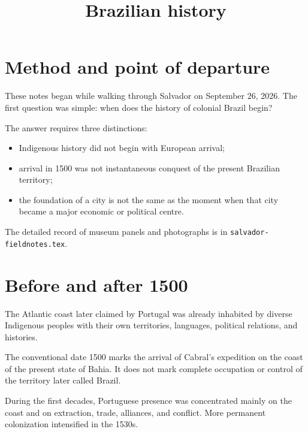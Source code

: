 



\title{Brazilian history}
\maketitle

\label{section-phantom}

\tableofcontents

\section{Method and point of departure}
\label{section-history-method}

These notes began while walking through
Salvador on September 26, 2026.  The first
question was simple: when does the history
of colonial Brazil begin?

The answer requires three distinctions:

\begin{itemize}
\item Indigenous history did not begin with
European arrival;
\item arrival in 1500 was not instantaneous
conquest of the present Brazilian
territory;
\item the foundation of a city is not the
same as the moment when that city became a
major economic or political centre.
\end{itemize}

The detailed record of museum panels and
photographs is in
\texttt{salvador-fieldnotes.tex}.

\section{Before and after 1500}
\label{section-before-after-1500}

The Atlantic coast later claimed by
Portugal was already inhabited by diverse
Indigenous peoples with their own
territories, languages, political
relations, and histories.

The conventional date 1500 marks the
arrival of Cabral's expedition on the coast
of the present state of Bahia.  It does not
mark complete occupation or control of the
territory later called Brazil.

During the first decades, Portuguese
presence was concentrated mainly on the
coast and on extraction, trade, alliances,
and conflict.  More permanent colonization
intensified in the 1530s.

